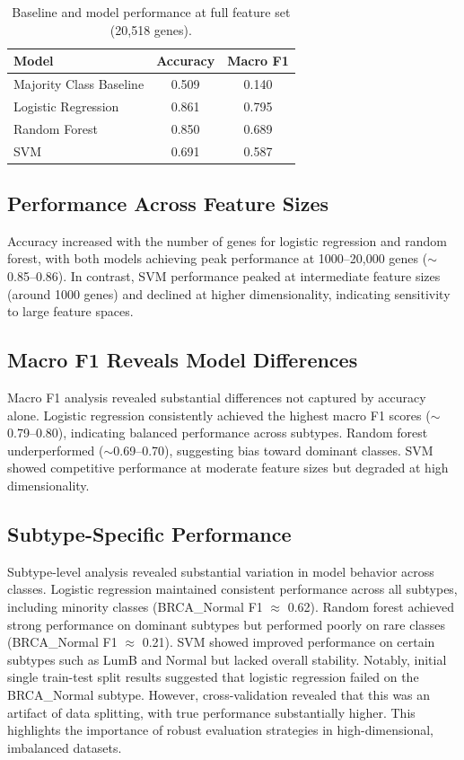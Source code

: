 \documentclass[10pt,twocolumn,letterpaper]{article}
\begin{document}
\begin{table}[H]
    \centering
    \caption{Baseline and model performance at full feature set (20,518 genes).}
    \label{tab:baseline}
    \begin{tabular}{lcc}
        \toprule
        \textbf{Model} & \textbf{Accuracy} & \textbf{Macro F1} \\
        \midrule
        Majority Class Baseline & 0.509 & 0.140 \\
        Logistic Regression     & 0.861 & 0.795 \\
        Random Forest           & 0.850 & 0.689 \\
        SVM                     & 0.691 & 0.587 \\
        \bottomrule
    \end{tabular}
\end{table}

\subsection{Performance Across Feature Sizes}

Accuracy increased with the number of genes for logistic regression and random forest, with both models achieving peak performance at 1000--20,000 genes ($\sim$0.85--0.86). In contrast, SVM performance peaked at intermediate feature sizes (around 1000 genes) and declined at higher dimensionality, indicating sensitivity to large feature spaces.

\subsection{Macro F1 Reveals Model Differences}

Macro F1 analysis revealed substantial differences not captured by accuracy alone. Logistic regression consistently achieved the highest macro F1 scores ($\sim$0.79--0.80), indicating balanced performance across subtypes. Random forest underperformed ($\sim$0.69--0.70), suggesting bias toward dominant classes. SVM showed competitive performance at moderate feature sizes but degraded at high dimensionality.

\subsection{Subtype-Specific Performance}

Subtype-level analysis revealed substantial variation in model behavior across classes. Logistic regression maintained consistent performance across all subtypes, including minority classes (BRCA\_Normal F1 $\approx$ 0.62). Random forest achieved strong performance on dominant subtypes but performed poorly on rare classes (BRCA\_Normal F1 $\approx$ 0.21). SVM showed improved performance on certain subtypes such as LumB and Normal but lacked overall stability. Notably, initial single train-test split results suggested that logistic regression failed on the BRCA\_Normal subtype. However, cross-validation revealed that this was an artifact of data splitting, with true performance substantially higher. This highlights the importance of robust evaluation strategies in high-dimensional, imbalanced datasets.
\end{document}
